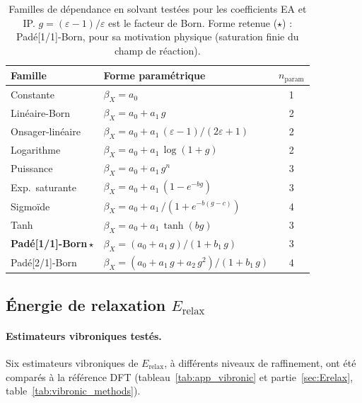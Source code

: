 \begin{table}[H]
\centering
\caption{Familles de dépendance en solvant testées pour les coefficients EA et IP. $g = (\varepsilon - 1)/\varepsilon$ est le facteur de Born. Forme retenue ($\star$) : Padé[1/1]-Born, pour sa motivation physique (saturation finie du champ de réaction).}
\label{tab:app_solvent_families}
\footnotesize
\begin{tabular}{l l c}
\toprule
\textbf{Famille} & \textbf{Forme paramétrique} & $n_\text{param}$ \\
\midrule
Constante                    & $\beta_X = a_0$ & 1 \\
Linéaire-Born                & $\beta_X = a_0 + a_1\, g$ & 2 \\
Onsager-linéaire             & $\beta_X = a_0 + a_1\, (\varepsilon - 1)/(2\varepsilon + 1)$ & 2 \\
Logarithme                   & $\beta_X = a_0 + a_1\, \log(1 + g)$ & 2 \\
Puissance                    & $\beta_X = a_0 + a_1\, g^n$ & 3 \\
Exp.\ saturante              & $\beta_X = a_0 + a_1\, (1 - e^{-b g})$ & 3 \\
Sigmoïde                     & $\beta_X = a_0 + a_1\, / (1 + e^{-b (g - c)})$ & 4 \\
Tanh                         & $\beta_X = a_0 + a_1\, \tanh(b g)$ & 3 \\
\textbf{Padé[1/1]-Born}\,$\star$ & $\beta_X = (a_0 + a_1\, g) / (1 + b_1\, g)$ & 3 \\
Padé[2/1]-Born               & $\beta_X = (a_0 + a_1\, g + a_2\, g^2) / (1 + b_1\, g)$ & 4 \\
\bottomrule
\end{tabular}
\end{table}

\subsection{Énergie de relaxation \texorpdfstring{$E_\text{relax}$}{E\_relax}}
\label{app:erelax_search}

\paragraph{Estimateurs vibroniques testés.}
Six estimateurs vibroniques de $E_\text{relax}$, à différents niveaux de raffinement, ont été comparés à la référence DFT (tableau~\ref{tab:app_vibronic} et partie~\ref{sec:Erelax}, table~\ref{tab:vibronic_methods}).

